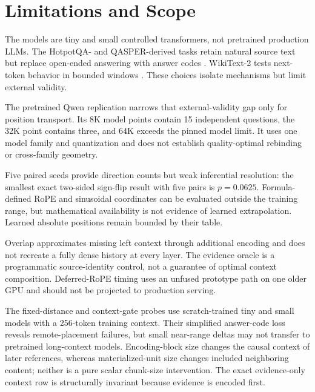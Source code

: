 \documentclass[11pt]{article}
\begin{document}
\section{Limitations and Scope}

The models are tiny and small controlled transformers, not pretrained production LLMs. The
HotpotQA- and QASPER-derived tasks retain natural source text but replace open-ended answering
with answer codes \cite{yang2018hotpotqa,dasigi2021qasper}. WikiText-2 tests next-token behavior
in bounded windows \cite{merity2016pointer}. These choices isolate mechanisms but limit
external validity.

The pretrained Qwen replication narrows that external-validity gap only for
position transport. Its 8K model points contain 15 independent questions, the
32K point contains three, and 64K exceeds the pinned model limit. It uses one
model family and quantization and does not establish quality-optimal rebinding
or cross-family geometry.

Five paired seeds provide direction counts but weak inferential resolution: the smallest
exact two-sided sign-flip result with five pairs is $p=0.0625$. Formula-defined RoPE and
sinusoidal coordinates can be evaluated outside the training range, but mathematical
availability is not evidence of learned extrapolation. Learned absolute positions remain
bounded by their table.

Overlap approximates missing left context through additional encoding and does not recreate a
fully dense history at every layer. The evidence oracle is a programmatic source-identity
control, not a guarantee of optimal context composition. Deferred-RoPE timing uses an unfused
prototype path on one older GPU and should not be projected to production serving.

The fixed-distance and context-gate probes use scratch-trained tiny and small models with a
256-token training context. Their simplified answer-code loss reveals remote-placement
failures, but small near-range deltas may not transfer to pretrained long-context models.
Encoding-block size changes the causal context of later references, whereas materialized-unit
size changes included neighboring content; neither is a pure scalar chunk-size intervention.
The exact evidence-only context row is structurally invariant because evidence is encoded
first.
\end{document}

